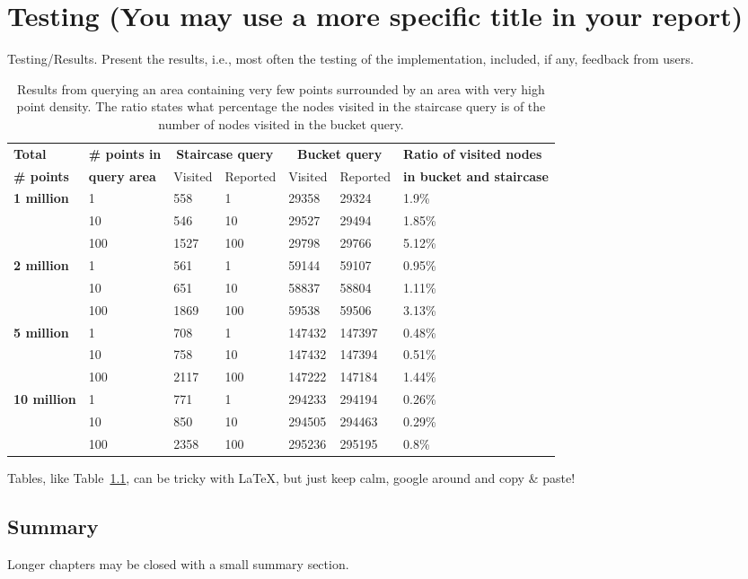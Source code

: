 \cleardoublepage
\chapter{Testing (You may use a more specific title in your report)}
\label{testing} Testing/Results. Present the results, i.e., most
often the testing of the implementation, included, if any, feedback
from users.


\begin{table}[h]
    \begin{center}
    \caption[Results from querying an area containing very few points surrounded by an area with very high point density.]{Results from querying an area containing very few points surrounded by an area with very high point density. The ratio states what percentage the nodes visited in the staircase query is of the number of nodes visited in the bucket query.}
        \begin{tabular}{| l | l | l | l | l | l | l |}
            \hline
            \textbf{Total} & \textbf{\#{} points in} & \multicolumn{2}{|c|}{\textbf{Staircase query}} & \multicolumn{2}{|c|}{\textbf{Bucket query}} & \textbf{Ratio of visited nodes} \\ \cline{3-6}
            \textbf{\#{} points} & \textbf{query area} & Visited & Reported & Visited & Reported & \textbf{in bucket and staircase} \\  \hline
            \multirow{3}{*}{\textbf{1 million}} & 1 & 558 & 1 & 29358 & 29324 & 1.9\% \\ \cline{2-7}
            & 10 & 546 & 10 & 29527 & 29494 & 1.85\% \\ \cline{2-7}
            & 100 & 1527 & 100 & 29798 & 29766 & 5.12\% \\ \hline \hline
            \multirow{3}{*}{\textbf{2 million}} & 1 & 561 & 1 & 59144 & 59107 & 0.95\% \\ \cline{2-7}
            & 10 & 651 & 10 & 58837 & 58804 & 1.11\% \\ \cline{2-7}
            & 100 & 1869 & 100 & 59538 & 59506 & 3.13\% \\ \hline \hline
            \multirow{3}{*}{\textbf{5 million}} & 1 & 708 & 1 & 147432 & 147397 & 0.48\% \\ \cline{2-7}
            & 10 & 758 & 10 & 147432 & 147394 & 0.51\% \\ \cline{2-7}
            & 100 & 2117 & 100 & 147222 & 147184 & 1.44\% \\ \hline \hline
            \multirow{3}{*}{\textbf{10 million}} & 1 & 771 & 1 & 294233 & 294194 & 0.26\% \\ \cline{2-7}
            & 10 & 850 & 10 & 294505 & 294463 & 0.29\% \\ \cline{2-7}
            & 100 & 2358 & 100 & 295236 & 295195 & 0.8\% \\ \hline
        \end{tabular}
    \end{center}
    \label{tab:smallarea}
\end{table}

Tables, like Table~\ref{tab:smallarea}, can be tricky with \LaTeX,
but just keep calm, google around and copy \& paste!

\section{Summary}
Longer chapters may be closed with a small summary section.
